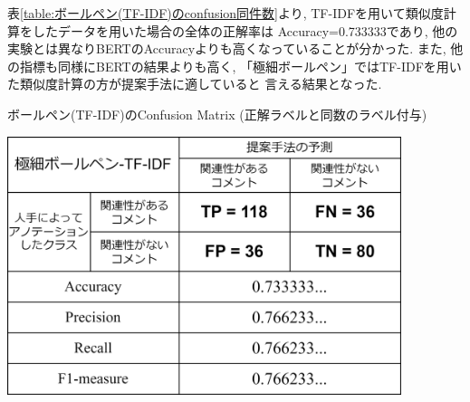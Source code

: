 \documentclass{ltjarticle}
\begin{document}
表\ref{table:ボールペン(TF-IDF)のconfusion同件数}より, TF-IDFを用いて類似度計算をしたデータを用いた場合の全体の正解率は
Accuracy=0.733333であり, 他の実験とは異なりBERTのAccuracyよりも高くなっていることが分かった. 
また, 他の指標も同様にBERTの結果よりも高く, 「極細ボールペン」ではTF-IDFを用いた類似度計算の方が提案手法に適していると
言える結果となった. 
\begin{table}[ht]
    \centering
    \caption{ボールペン(TF-IDF)のConfusion Matrix (正解ラベルと同数のラベル付与)}
    \vspace{5truept}

    \includegraphics[width = 11.5cm]{images/ボールペンimages/TF-IDF同件数.drawio.png}
    \label{table:ボールペン(TF-IDF)のconfusion同件数}
\end{table}
\end{document}
